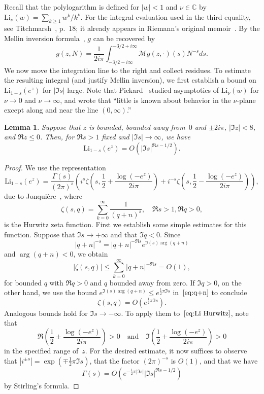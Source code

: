 \documentclass[a4paper]{amsart}
\newtheorem{lemma}[theorem]{Lemma}
\begin{document}
Recall that the polylogarithm is
defined for $|w|<1$  and $\nu\in\mathbb{C}$ by $\mathrm{Li}_\nu(w) = \sum_{k\geq1}w^k/k^\nu$.
For the integral evaluation used in the third equality,
see Titchmarsh~\cite{Ti86}, p.~18; it already appears in Riemann's
original memoir~\cite{Ri59}.
By the Mellin inversion formula~\cite{FlGoDu95},  $g$ can be recovered by
\begin{equation}\label{eq:g mell}
  g(z,N) = \frac{1}{2i\pi} \int_{-3/2-i\infty}^{-3/2+i \infty} \mathcal{M}g(z,\cdot)(s) N^{-s}ds.
\end{equation}
We now move the integration line to the right and collect residues.
To estimate the resulting integral (and justify Mellin inversion),
we first establish a bound on
$ \mathrm{Li}_{1-s}(e^z)$ for $|\Im s|$ large. Note that Pickard~\cite{Pi68}
studied asymptotics of $\mathrm{Li}_\nu(w)$ for $\nu\to0$ and $\nu\to\infty$,
and wrote that ``little is known about behavior in the $\nu$-plane
except along and near the line $(0,\infty)$.''
%
\begin{lemma}\label{le:Li}
  Suppose that $z$ is bounded, bounded away from~$0$ and $\pm 2i\pi$,
  $|\Im z|<8$, and $\Re z \leq 0$. Then,
  for $\Re s>1$ fixed and $|\Im s|\to\infty$, we have
  \[
     \mathrm{Li}_{1-s}(e^z) = O( |\Im s|^{\Re s -1/2}).
  \]
\end{lemma}
\begin{proof}
  We use the representation
  \begin{equation}\label{eq:Li Hurwitz}
    \mathrm{Li}_{1-s}(e^z) = \frac{\Gamma(s)}{(2\pi)^s}
      \left( i^s \zeta\left(s,\frac12 + \frac{\log(-e^z)}{2i\pi}\right)
      + i^{-s} \zeta\left(s,\frac12 - \frac{\log(-e^z)}{2i\pi}\right)\right),
  \end{equation}
  due to Jonqui{\`e}re~\cite{Jo89}, where
  \[
    \zeta(s,q) = \sum_{k=0}^\infty \frac{1}{(q+n)^s}, \quad \Re s >1, \Re q >0,
  \]
  is the Hurwitz zeta function. 
  First we establish some simple estimates for this function.
  Suppose that $\Im s \to +\infty$ and that $\Im q <0$. Since
  \begin{equation}\label{eq:q+n}
    |q+n|^{-s} = |q+n|^{-\Re s} e^{\Im(s) \arg(q+n)}
  \end{equation}
  and $\arg(q+n)<0$, we obtain
  \[
     |\zeta(s,q)| \leq \sum_{k=0}^\infty |q+n|^{-\Re s} = O(1),
  \]
  for bounded $q$ with $\Re q>0$ and $q$ bounded away from zero.
  If $\Im q >0$, on the other hand, we use the bound $e^{\Im(s) \arg(q+n)}
  \leq e^{\tfrac12 \pi \Im s}$ in~$\ref{eq:q+n}$ to conclude
  \[
     \zeta(s,q) = O(e^{\tfrac12 \pi \Im s}).
  \]
  Analogous bounds hold for $\Im s\to-\infty$. To apply them to~$\ref{eq:Li Hurwitz}$,
  note that
  \[
    \Re\left(\frac12 \pm \frac{\log(-e^z)}{2i\pi}\right)>0 \quad \text{and} \quad
    \Im\left(\frac12 + \frac{\log(-e^z)}{2i\pi}\right)>0
  \]
  in the specified range of~$z$.
  For the desired estimate, it now suffices to observe that
   $|i^{\pm s}|=\exp(\mp \tfrac12\pi
    \Im s)$, that the factor $(2\pi)^{-s}$ is $O(1)$, and that we have
  \[
    \Gamma(s) = O(e^{-\tfrac12 \pi |\Im s|} |\Im s|^{\Re s - 1/2})
  \]
  by Stirling's formula.
\end{proof}
\end{document}
